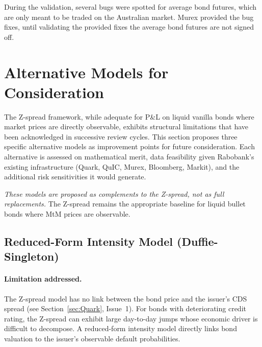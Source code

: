 \documentclass[reviewdoc]{pmv_report}  %
\begin{document}
\vspace{0.5cm}
\noindent{}
\vspace{0.5cm}

During the validation, several bugs were spotted for average bond futures, which are only meant to be traded on the Australian market.
Murex provided the bug fixes, until validating the provided fixes the average bond futures are not signed off.

\section{Alternative Models for Consideration}\label{sec:AlternativeModels}

The Z-spread framework, while adequate for P\&L on liquid vanilla bonds where market prices are directly observable, exhibits structural limitations that have been acknowledged in successive review cycles.
This section proposes three specific alternative models as improvement points for future consideration.
Each alternative is assessed on mathematical merit, data feasibility given Rabobank's existing infrastructure (Quark, QuIC, Murex, Bloomberg, Markit), and the additional risk sensitivities it would generate.

\emph{These models are proposed as complements to the Z-spread, not as full replacements.}
The Z-spread remains the appropriate baseline for liquid bullet bonds where MtM prices are observable.

\subsection{Reduced-Form Intensity Model (Duffie-Singleton)}\label{sec:ReducedForm}

\paragraph{Limitation addressed.}
The Z-spread model has no link between the bond price and the issuer's CDS spread (see Section~\ref{sec:Quark}, Issue~1).
For bonds with deteriorating credit rating, the Z-spread can exhibit large day-to-day jumps whose economic driver is difficult to decompose.
A reduced-form intensity model directly links bond valuation to the issuer's observable default probabilities.
\end{document}
